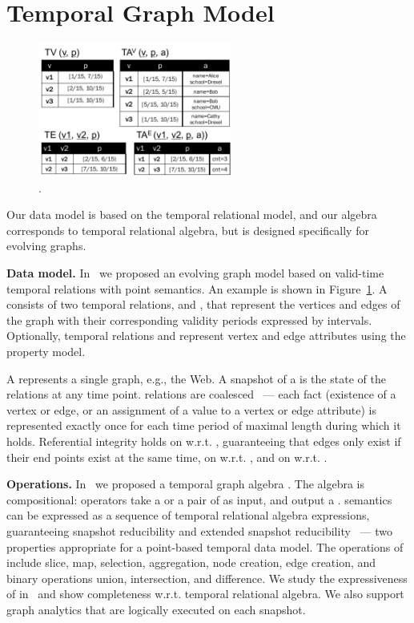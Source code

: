 \section{Temporal Graph Model}
\label{sec:tga}

\begin{figure}[t]
\centering
\includegraphics[width=2.5in]{figs/T1_rel.pdf}
\vspace{-0.2cm}
\caption{\tg {}.}
\vspace{-0.5cm}
\label{fig:tg_rel}
\end{figure}

Our data model is based on the temporal relational model, and our
algebra corresponds to temporal relational algebra, but is designed
specifically for evolving graphs.  

{\bf Data model.}  In~\cite{PortalarXiv2016} we proposed an evolving
graph model \tg based on valid-time temporal relations with point
semantics. An example is shown in Figure~\ref{fig:tg_rel}.  A \tg
consists of two temporal relations,  and , that
represent the vertices and edges of the graph with their corresponding
validity periods expressed by intervals.  Optionally, temporal
relations  and  represent vertex and edge
attributes using the property model.

A \tg represents a single graph, e.g., the Web.  A
snapshot of a \tg is the state of the relations at any time point.
\tg relations are coalesced~\cite{DBLP:conf/vldb/BohlenSS96} --- each
fact (existence of a vertex or edge, or an assignment of a value to a
vertex or edge attribute) is represented exactly once for each time
period of maximal length during which it holds.  Referential integrity
holds on  w.r.t. , guaranteeing that edges only
exist if their end points exist at the same time, on 
w.r.t. , and on  w.r.t. .

{\bf Operations.} In~\cite{PortalarXiv2016} we proposed a temporal
graph algebra \tga.  The algebra is compositional: operators take a
\tg or a pair of \tgs as input, and output a \tg.  \tga semantics can
be expressed as a sequence of temporal relational algebra expressions,
guaranteeing snapshot reducibility and extended snapshot
reducibility~\cite{DBLP:reference/db/Bohlen092} --- two properties
appropriate for a point-based temporal data model.  The operations of
\tga include slice, map, selection, aggregation, node creation, edge
creation, and binary operations union, intersection, and difference.
We study the expressiveness of \tga in~\cite{PortalarXiv2016} and show
completeness w.r.t. temporal relational algebra.  We also support
graph analytics that are logically executed on each
snapshot.

